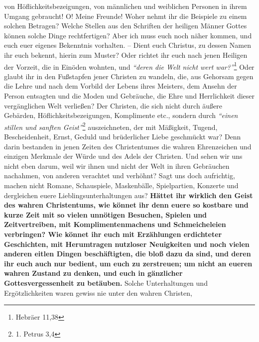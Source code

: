 von Höflichkeitsbezeigungen, von männlichen und weiblichen Personen in ihrem
Umgang gebraucht! O! Meine Freunde! Woher nehmt ihr die Beispiele zu einem
solchen Betragen? Welche Stellen aus den Schriften der heiligen Männer Gottes
können solche Dinge rechtfertigen? Aber ich muss euch noch näher kommen, und
euch
euer eigenes Bekenntnis vorhalten. -- Dient euch Christus, zu dessen Namen ihr
euch bekennt, hierin zum Muster? Oder richtet ihr euch
nach jenen Heiligen der
Vorzeit, die in Einöden wohnten, und
\textit{"`deren die Welt nicht wert war?"'}\footnote{Hebräer 11,38}
Oder glaubt ihr in den Fußstapfen jener Christen zu
wandeln, die, aus Gehorsam gegen die Lehre und nach dem Vorbild der Lebens
ihres Meisters, dem Ansehn der Person entsagten und die Moden und Gebräuche,
die Ehre und Herrlichkeit dieser vergänglichen Welt verließen? Der Christen, die
sich nicht durch äußere Gebärden, Höflichkeitsbezeigungen, Komplimente etc.,
sondern durch
\textit{"`einen stillen und sanften Geist"'}\footnote{1. Petrus 3,4}
auszeichneten, der mit Mäßigkeit, Tugend,
Bescheidenheit, Ernst, Geduld und
brüderlicher Liebe geschmückt war? Denn darin bestanden in jenen Zeiten des
Christentumes die wahren Ehrenzeichen und einzigen Merkmale der Würde und des
Adels der Christen. Und sehen wir uns nicht eben darum, weil wir ihnen und nicht
der Welt in ihren Gebräuchen nachahmen, von anderen verachtet und verhöhnt? Sagt
uns doch aufrichtig, machen nicht Romane,
Schauspiele, Maskenbälle,
Spielpartien, Konzerte und dergleichen euere
Lieblingsunterhaltungen aus? \label{ref:10_08_zeitvertreib} \textbf{Hättet ihr
wirklich den Geist des wahren Christentums, wie
könnet ihr denn euere so
kostbare und kurze Zeit mit so vielen unnötigen Besuchen,
Spielen und
Zeitvertreiben, mit Komplimentenmachens und Schmeicheleien
verbringen? Wie
könnet ihr euch mit Erzählungen erdichteter
Geschichten, mit Herumtragen
nutzloser Neuigkeiten und noch vielen anderen
eitlen
Dingen beschäftigten, die
bloß dazu da sind, und deren ihr euch auch nur bedient, um euch zu
zerstreuen;
um nicht an eueren wahren Zustand zu denken, und euch in gänzlicher
Gottesvergessenheit zu
betäuben.} Solche Unterhaltungen und Ergötzlichkeiten
waren gewiss nie unter den wahren Christen,
